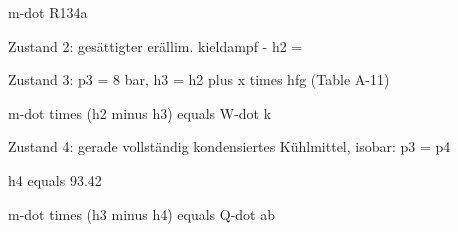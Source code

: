 m-dot R134a

Zustand 2: gesättigter erällim. kieldampf - h2 = 

Zustand 3: p3 = 8 bar, h3 = h2 plus x times hfg (Table A-11)

m-dot times (h2 minus h3) equals W-dot k

Zustand 4: gerade vollständig kondensiertes Kühlmittel, isobar: p3 = p4

h4 equals 93.42

m-dot times (h3 minus h4) equals Q-dot ab